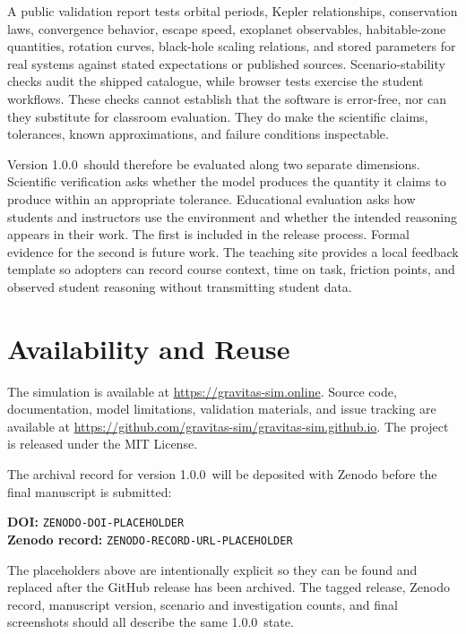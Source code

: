 \documentclass[twocolumn]{aastex631}
\newcommand{\Version}{1.0.0}
\newcommand{\ReleaseDOI}{ZENODO-DOI-PLACEHOLDER}
\newcommand{\ZenodoRecord}{ZENODO-RECORD-URL-PLACEHOLDER}
\begin{document}
A public validation report tests orbital periods, Kepler relationships,
conservation laws, convergence behavior, escape speed, exoplanet observables,
habitable-zone quantities, rotation curves, black-hole scaling relations, and
stored parameters for real systems against stated expectations or published
sources. Scenario-stability checks audit the shipped catalogue, while browser
tests exercise the student workflows. These checks cannot establish that the
software is error-free, nor can they substitute for classroom evaluation. They
do make the scientific claims, tolerances, known approximations, and failure
conditions inspectable.

Version \Version\ should therefore be evaluated along two separate dimensions.
Scientific verification asks whether the model produces the quantity it claims
to produce within an appropriate tolerance. Educational evaluation asks how
students and instructors use the environment and whether the intended
reasoning appears in their work. The first is included in the release process.
Formal evidence for the second is future work. The teaching site provides a
local feedback template so adopters can record course context, time on task,
friction points, and observed student reasoning without transmitting student
data.

\section{Availability and Reuse}
\label{sec:availability}

The simulation is available at \url{https://gravitas-sim.online}. Source code,
documentation, model limitations, validation materials, and issue tracking are
available at
\url{https://github.com/gravitas-sim/gravitas-sim.github.io}. The project is
released under the MIT License.

The archival record for version \Version\ will be deposited with Zenodo before
the final manuscript is submitted:

\begin{center}
\textbf{DOI:} \texttt{\ReleaseDOI}\\
\textbf{Zenodo record:} \texttt{\ZenodoRecord}
\end{center}

The placeholders above are intentionally explicit so they can be found and
replaced after the GitHub release has been archived. The tagged release,
Zenodo record, manuscript version, scenario and investigation counts, and final
screenshots should all describe the same \Version\ state.
\end{document}
